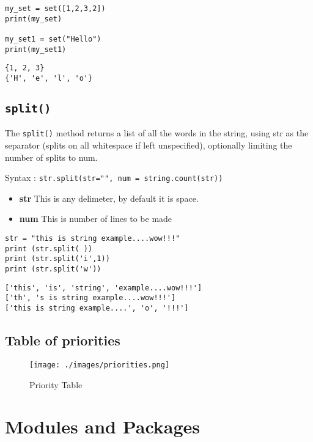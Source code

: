\documentclass[11pt]{article}
\begin{document}
\begin{verbatim}
my_set = set([1,2,3,2])
print(my_set)

my_set1 = set("Hello")
print(my_set1)
\end{verbatim}

\begin{verbatim}
{1, 2, 3}
{'H', 'e', 'l', 'o'}
\end{verbatim}

\subsection{\texttt{split()}}
\label{sec:org938696b}
The \texttt{split()} method returns a list of all the words in the string,
using str as the separator (splits on all whitespace if left
unspecified), optionally limiting the number of splits to num.

Syntax : \texttt{str.split(str="", num = string.count(str))}

\begin{itemize}
\item \textbf{str}  This is any delimeter, by default it is space.
\item \textbf{num}  This is number of lines to be made
\end{itemize}

\begin{verbatim}
str = "this is string example....wow!!!"
print (str.split( ))
print (str.split('i',1))
print (str.split('w'))
\end{verbatim}

\begin{verbatim}
['this', 'is', 'string', 'example....wow!!!']
['th', 's is string example....wow!!!']
['this is string example....', 'o', '!!!']
\end{verbatim}

\newpage

\subsection{Table of priorities}
\label{sec:org1d02555}

\begin{figure}[htbp]
\centering
\texttt{[image: ./images/priorities.png]}
\caption{Priority Table}
\end{figure}

\newpage
\section{Modules and Packages}
\label{sec:orgcff350d}
\end{document}
